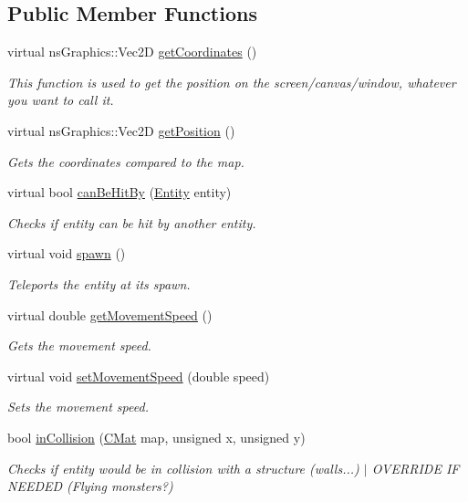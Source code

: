 \subsection*{Public Member Functions}
\begin{DoxyCompactItemize}
\item 
virtual ns\+Graphics\+::\+Vec2D \hyperlink{classns_game_1_1_entity_a727ed96ea0a27b7232e701ed0ba6d3a4}{get\+Coordinates} ()
\begin{DoxyCompactList}\small\item\em This function is used to get the position on the screen/canvas/window, whatever you want to call it. \end{DoxyCompactList}\item 
virtual ns\+Graphics\+::\+Vec2D \hyperlink{classns_game_1_1_entity_ab7fc1631346d2c643161d229dd653edd}{get\+Position} ()
\begin{DoxyCompactList}\small\item\em Gets the coordinates compared to the map. \end{DoxyCompactList}\item 
virtual bool \hyperlink{classns_game_1_1_entity_a3e5ba5a1f5b7491dc79b3dbbe5f75701}{can\+Be\+Hit\+By} (\hyperlink{classns_game_1_1_entity}{Entity} entity)
\begin{DoxyCompactList}\small\item\em Checks if entity can be hit by another entity. \end{DoxyCompactList}\item 
virtual void \hyperlink{classns_game_1_1_entity_ac09f45ca50c9fef57a50c4414fc7e20d}{spawn} ()
\begin{DoxyCompactList}\small\item\em Teleports the entity at its spawn. \end{DoxyCompactList}\item 
virtual double \hyperlink{classns_game_1_1_entity_a03b934337b3c013abcccf3dfea6396d1}{get\+Movement\+Speed} ()
\begin{DoxyCompactList}\small\item\em Gets the movement speed. \end{DoxyCompactList}\item 
virtual void \hyperlink{classns_game_1_1_entity_a0254c30b6223caa723303266ad04e4cd}{set\+Movement\+Speed} (double speed)
\begin{DoxyCompactList}\small\item\em Sets the movement speed. \end{DoxyCompactList}\item 
bool \hyperlink{classns_game_1_1_entity_a5dd00624fa76be09de80a6d2a982ea09}{in\+Collision} (\hyperlink{type_8h_a64a592133575ccebb1b36453acbec02b}{C\+Mat} map, unsigned x, unsigned y)
\begin{DoxyCompactList}\small\item\em Checks if entity would be in collision with a structure (walls...) $\vert$ O\+V\+E\+R\+R\+I\+DE IF N\+E\+E\+D\+ED (Flying monsters?) \end{DoxyCompactList}\end{DoxyCompactItemize}
